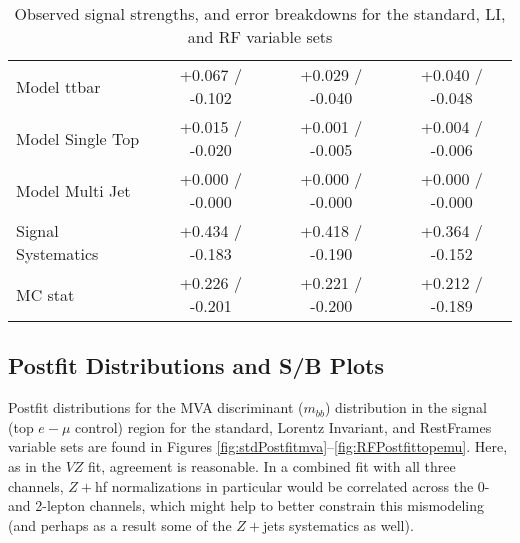 \begin{table}[!htbp]
\begin{center}
\begin{tabular}{lccc}
Model ttbar &  +0.067 / -0.102  &  +0.029 / -0.040  &  +0.040 / -0.048 \\
Model Single Top &  +0.015 / -0.020  &  +0.001 / -0.005  &  +0.004 / -0.006 \\
Model Multi Jet &  +0.000 / -0.000  &  +0.000 / -0.000  &  +0.000 / -0.000 \\
Signal Systematics &  +0.434 / -0.183  &  +0.418 / -0.190  &  +0.364 / -0.152 \\
MC stat &  +0.226 / -0.201  &  +0.221 / -0.200  &  +0.212 / -0.189 \\
\hline\hline
\end{tabular}
\end{center}
\caption{Observed signal strengths, and error breakdowns for the standard, LI, and RF variable sets}
\label{tab:breakdownobs}
\end{table}
\clearpage

\subsection{Postfit Distributions and S/B Plots}
Postfit distributions for the MVA discriminant ($m_{bb}$) distribution in the signal (top $e-\mu$ control) region for the standard, Lorentz Invariant, and RestFrames variable sets are found in Figures \ref{fig:stdPostfitmva}--\ref{fig:RFPostfittopemu}.  Here, as in the $VZ$ fit, agreement is reasonable.  In a combined fit with all three channels, $Z+$hf normalizations in particular would be correlated across the 0- and 2-lepton channels, which might help to better constrain this mismodeling (and perhaps as a result some of the $Z+$jets systematics as well).

